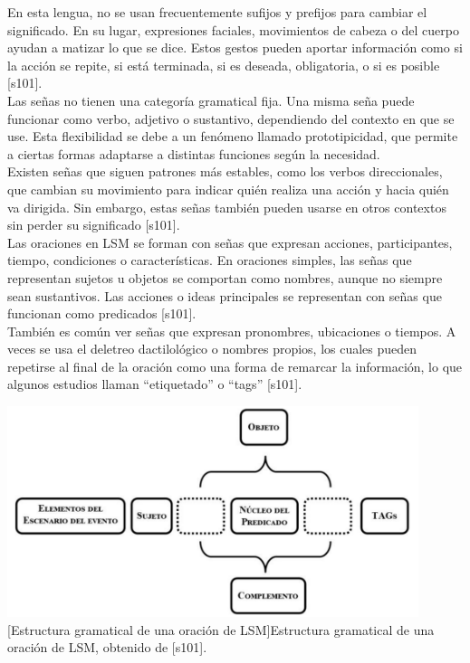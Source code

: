 En esta lengua, no se usan frecuentemente sufijos y prefijos para cambiar el significado. En su lugar, expresiones faciales, movimientos de cabeza o del cuerpo ayudan a matizar lo que se dice. Estos gestos pueden aportar información como si la acción se repite, si está terminada, si es deseada, obligatoria, o si es posible [s101].\\

Las señas no tienen una categoría gramatical fija. Una misma seña puede funcionar como verbo, adjetivo o sustantivo, dependiendo del contexto en que se use. Esta flexibilidad se debe a un fenómeno llamado prototipicidad, que permite a ciertas formas adaptarse a distintas funciones según la necesidad.\\

Existen señas que siguen patrones más estables, como los verbos direccionales, que cambian su movimiento para indicar quién realiza una acción y hacia quién va dirigida. Sin embargo, estas señas también pueden usarse en otros contextos sin perder su significado [s101].\\

Las oraciones en LSM se forman con señas que expresan acciones, participantes, tiempo, condiciones o características. En oraciones simples, las señas que representan sujetos u objetos se comportan como nombres, aunque no siempre sean sustantivos. Las acciones o ideas principales se representan con señas que funcionan como predicados [s101].\\

También es común ver señas que expresan pronombres, ubicaciones o tiempos. A veces se usa el deletreo dactilológico o nombres propios, los cuales pueden repetirse al final de la oración como una forma de remarcar la información, lo que algunos estudios llaman “etiquetado” o “tags” [s101].\\

\begin{center}
    \includegraphics[width=0.9\textwidth]{Images/Cap 2/Estructura_gramatica_LSM.png}
    [Estructura gramatical de una oración de LSM]{Estructura gramatical de una oración de LSM, obtenido de [s101].}  %
\end{center}

